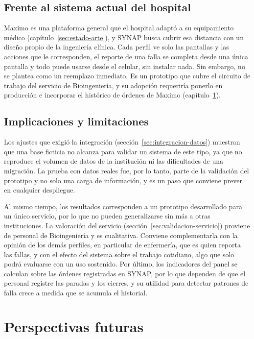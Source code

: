 \documentclass[10pt]{article}
\begin{document}
\subsection{Frente al sistema actual del hospital}
\label{sec:frente-maximo}

Maximo es una plataforma general que el hospital adaptó a su equipamiento médico (capítulo~\ref{sec:estado-arte}), y SYNAP busca cubrir esa distancia con un diseño propio de la ingeniería clínica. Cada perfil ve solo las pantallas y las acciones que le corresponden, el reporte de una falla se completa desde una única pantalla y todo puede usarse desde el celular, sin instalar nada. Sin embargo, no se plantea como un reemplazo inmediato. Es un prototipo que cubre el circuito de trabajo del servicio de Bioingeniería, y su adopción requeriría ponerlo en producción e incorporar el histórico de órdenes de Maximo (capítulo~\ref{sec:futuro}).

\subsection{Implicaciones y limitaciones}
\label{sec:alcance-limitaciones}

Los ajustes que exigió la integración (sección~\ref{sec:integracion-datos}) muestran que una base ficticia no alcanza para validar un sistema de este tipo, ya que no reproduce el volumen de datos de la institución ni las dificultades de una migración. La prueba con datos reales fue, por lo tanto, parte de la validación del prototipo y no solo una carga de información, y es un paso que conviene prever en cualquier despliegue.

Al mismo tiempo, los resultados corresponden a un prototipo desarrollado para un único servicio, por lo que no pueden generalizarse sin más a otras instituciones. La valoración del servicio (sección~\ref{sec:validacion-servicio}) proviene de personal de Bioingeniería y es cualitativa. Conviene complementarla con la opinión de los demás perfiles, en particular de enfermería, que es quien reporta las fallas, y con el efecto del sistema sobre el trabajo cotidiano, algo que solo podrá evaluarse con un uso sostenido. Por último, los indicadores del panel se calculan sobre las órdenes registradas en SYNAP, por lo que dependen de que el personal registre las paradas y los cierres, y su utilidad para detectar patrones de falla crece a medida que se acumula el historial.

\newpage
\section{Perspectivas futuras}
\label{sec:futuro}
\end{document}
